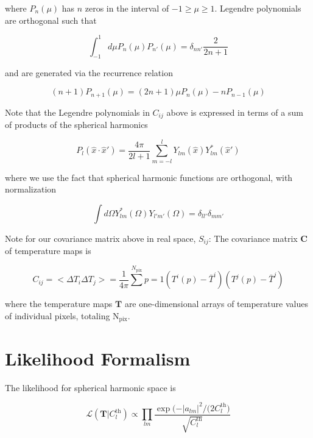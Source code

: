 \documentclass[a4paper, 11pt]{article}
\begin{document}
where $P_n(\mu)$ has $n$ zeros in the interval of $-1\geq\mu\geq1$. Legendre polynomials are orthogonal such that 

\begin{equation}
\int^{1}_{-1}d\mu P_{n}(\mu)P_{n'}(\mu)=\delta_{n n'}\frac{2}{2n+1}
\end{equation}

and are generated via the recurrence relation

\begin{equation}
(n+1)P_{n+1}(\mu) = (2n+1)\mu P_{n}(\mu) -n P_{n-1}(\mu)
\end{equation}

Note that the Legendre polynomials in $C_{ij}$ above is expressed in terms of a sum of products of the spherical harmonics

\begin{equation}
P_l(\hat{x}\cdot\hat{x}')=\frac{4\pi}{2l+1}\sum^{l}_{m=-l} Y_{lm}(\hat{x})Y^{*}_{lm}(\hat{x}')
\end{equation}

where we use the fact that spherical harmonic functions are orthogonal, with normalization

\begin{equation}
\int d\Omega Y^{*}_{lm}(\Omega)Y_{l'm'}(\Omega)=\delta_{ll'}\delta_{mm'}
\end{equation}

Note for our covariance matrix above in real space, $S_{ij}$: The covariance matrix \textbf{C} of temperature maps is

$$
C_{ij}=<\Delta T_i\Delta T_j>=\frac{1}{4\pi}\sum^{N_\text{pix}}{p=1}( T^{i}(p)-\bar{T}^{i})( T^{j}(p)-\bar{T}^{j})
$$

where the temperature maps $\textbf{T}$ are one-dimensional arrays of temperature values of individual pixels, totaling $\text{N}_\text{pix}$.

\par


\section*{Likelihood Formalism}

The likelihood for spherical harmonic space is

\begin{equation}
\mathcal{L}(\textbf{T} \vert C^{\text{th}}_l)\propto \prod_{lm} \frac{\exp\big(-\vert a_{lm}\vert^2/(2C^{\text{th}}_{l}\big)}{\sqrt{C^{\text{th}}_l}}
\end{equation}
\end{document}
